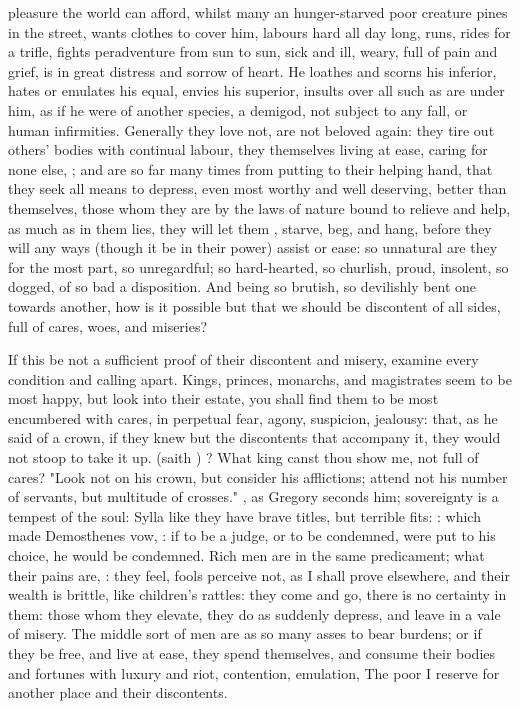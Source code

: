 pleasure the world can afford, whilst many an hunger-starved poor creature
pines in the street, wants clothes to cover him, labours hard all day long,
runs, rides for a trifle, fights peradventure from sun to sun, sick and ill,
weary, full of pain and grief, is in great distress and sorrow of heart. He
loathes and scorns his inferior, hates or emulates his equal, envies his
superior, insults over all such as are under him, as if he were of another
species, a demigod, not subject to any fall, or human infirmities. Generally
they love not, are not beloved again: they tire out others' bodies with
continual labour, they themselves living at ease, caring for none else,
; and are so far many times from putting to their helping hand,
that they seek all means to depress, even most worthy and well deserving,
better than themselves, those whom they are by the laws of nature bound to
relieve and help, as much as in them lies, they will let them , starve, beg, and hang,
before they will any ways (though it be in their power) assist or ease:
so unnatural are they for the most part, so unregardful;
so hard-hearted, so churlish, proud, insolent, so dogged, of so bad a
disposition. And being so brutish, so devilishly bent one towards another, how
is it possible but that we should be discontent of all sides, full of cares,
woes, and miseries?

If this be not a sufficient proof of their discontent and misery, examine every
condition and calling apart. Kings, princes, monarchs, and magistrates seem to
be most happy, but look into their estate, you shall find
them to be most encumbered with cares, in perpetual fear, agony, suspicion,
jealousy: that, as he said of a crown, if they knew but
the discontents that accompany it, they would not stoop to take it up.  (saith \Chrysostom{}) ? What king canst
thou show me, not full of cares? "Look not on his crown,
but consider his afflictions; attend not his number of servants, but multitude
of crosses." , as
Gregory seconds him; sovereignty is a tempest of the soul: Sylla like they have
brave titles, but terrible fits: : which
made Demosthenes vow, : if to be a judge, or to be condemned, were put to his
choice, he would be condemned. Rich men are in the same predicament; what their
pains are, : they feel, fools perceive not,
as I shall prove elsewhere, and their wealth is brittle, like children's
rattles: they come and go, there is no certainty in them: those whom they
elevate, they do as suddenly depress, and leave in a vale of misery. The middle
sort of men are as so many asses to bear burdens; or if they be free, and live
at ease, they spend themselves, and consume their bodies and fortunes with
luxury and riot, contention, emulation, \etc{} The poor I reserve for another
place and their discontents.

